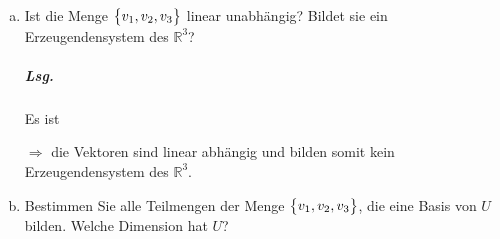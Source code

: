 \documentclass{scrreprt}
\begin{document}
\begin{enumerate}[(a)]
\item Ist die Menge $\qty\big{v_1, v_2, v_3}$ linear unabhängig?
  Bildet sie ein Erzeugendensystem des $\mathbb{R}^3$?

  \subparagraph{Lsg.} Es ist
  $\Rightarrow$ die Vektoren sind linear abhängig und bilden somit kein
  Erzeugendensystem des $\mathbb{R}^3$.

\item Bestimmen Sie alle Teilmengen der Menge $\qty\big{v_1, v_2, v_3}$, die eine
  Basis von $U$ bilden.
  Welche Dimension hat $U$?


\end{enumerate}
\end{document}
